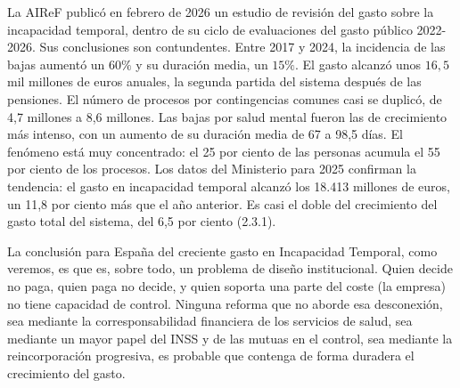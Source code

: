 \documentclass[10pt,a4paper]{article}
\begin{document}
La AIReF publicó en febrero de 2026 un estudio de revisión del gasto sobre la incapacidad temporal, dentro de su ciclo de evaluaciones del gasto público 2022-2026. Sus conclusiones son contundentes. Entre 2017 y 2024, la incidencia de las bajas aumentó un $60\%$ y su duración media, un $15\%$. El gasto alcanzó unos $16,5$ mil millones de euros anuales, la segunda partida del sistema después de las pensiones. El número de procesos por contingencias comunes casi se duplicó, de 4,7 millones a 8,6 millones. Las bajas por salud mental fueron las de crecimiento más intenso, con un aumento de su duración media de 67 a 98,5 días. El fenómeno está muy concentrado: el 25 por ciento de las personas acumula el 55 por ciento de los procesos. Los datos del Ministerio para 2025 confirman la tendencia: el gasto en incapacidad temporal alcanzó los 18.413 millones de euros, un 11,8 por ciento más que el año anterior. Es casi el doble del crecimiento del gasto total del sistema, del 6,5 por ciento (2.3.1).

La conclusión para España del creciente gasto en Incapacidad Temporal, como veremos, es que es, sobre todo, un problema de diseño institucional. Quien decide no paga, quien paga no decide, y quien soporta una parte del coste (la empresa) no tiene capacidad de control. Ninguna reforma que no aborde esa desconexión, sea mediante la corresponsabilidad financiera de los servicios de salud, sea mediante un mayor papel del INSS y de las mutuas en el control, sea mediante la reincorporación progresiva, es probable que contenga de forma duradera el crecimiento del gasto.
\end{document}
